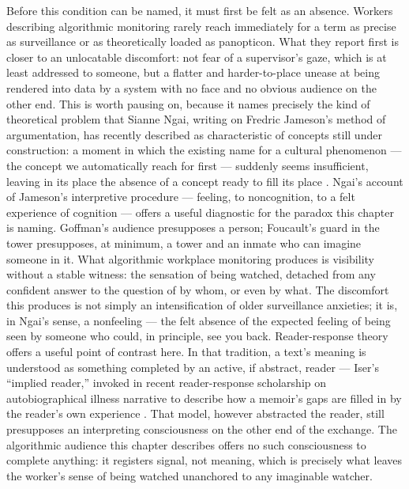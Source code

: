 \documentclass[10pt]{article}
\begin{document}
Before this condition can be named, it must first be felt as an absence. Workers describing algorithmic monitoring rarely reach immediately for a term as precise as surveillance or as theoretically loaded as panopticon. What they report first is closer to an unlocatable discomfort: not fear of a supervisor's gaze, which is at least addressed to someone, but a flatter and harder-to-place unease at being rendered into data by a system with no face and no obvious audience on the other end. This is worth pausing on, because it names precisely the kind of theoretical problem that Sianne Ngai, writing on Fredric Jameson's method of argumentation, has recently described as characteristic of concepts still under construction: a moment in which the existing name for a cultural phenomenon --- the concept we automatically reach for first --- suddenly seems insufficient, leaving in its place the absence of a concept ready to fill its place \cite{ngai}. Ngai's account of Jameson's interpretive procedure --- feeling, to noncognition, to a felt experience of cognition --- offers a useful diagnostic for the paradox this chapter is naming. Goffman's audience presupposes a person; Foucault's guard in the tower presupposes, at minimum, a tower and an inmate who can imagine someone in it. What algorithmic workplace monitoring produces is visibility without a stable witness: the sensation of being watched, detached from any confident answer to the question of by whom, or even by what. The discomfort this produces is not simply an intensification of older surveillance anxieties; it is, in Ngai's sense, a nonfeeling --- the felt absence of the expected feeling of being seen by someone who could, in principle, see you back. Reader-response theory offers a useful point of contrast here. In that tradition, a text's meaning is understood as something completed by an active, if abstract, reader --- Iser's ``implied reader,'' invoked in recent reader-response scholarship on autobiographical illness narrative to describe how a memoir's gaps are filled in by the reader's own experience \cite{vailankanni}. That model, however abstracted the reader, still presupposes an interpreting consciousness on the other end of the exchange. The algorithmic audience this chapter describes offers no such consciousness to complete anything: it registers signal, not meaning, which is precisely what leaves the worker's sense of being watched unanchored to any imaginable watcher.
\end{document}
